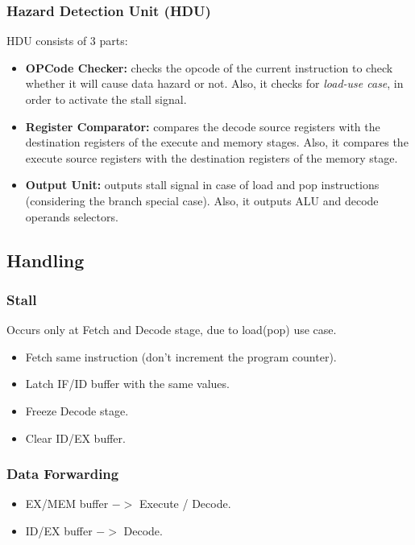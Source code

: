 \subsubsection{Hazard Detection Unit (HDU)}

HDU consists of 3 parts:
\begin{itemize}
    \item \textbf{OPCode Checker:} checks the opcode of the current instruction to check whether it will cause data hazard or not. Also, it checks for \emph{load-use case}, in order to activate the stall signal.
    \item \textbf{Register Comparator:} compares the decode source registers with the destination registers of the execute and memory stages. Also, it compares the execute source registers with the destination registers of the memory stage.
    \item \textbf{Output Unit:} outputs stall signal in case of load and pop instructions (considering the branch special case). Also, it outputs ALU and decode operands selectors. 
\end{itemize}

\subsection{Handling}

\subsubsection{Stall}
Occurs only at Fetch and Decode stage, due to load(pop) use case.
\begin{itemize}
    \item Fetch same instruction (don't increment the program counter).
    \item Latch IF/ID buffer with the same values.
    \item Freeze Decode stage.
    \item Clear ID/EX buffer.
\end{itemize}

\subsubsection{Data Forwarding}
\begin{itemize}
    \item EX/MEM buffer $->$ Execute / Decode.
    \item ID/EX buffer $->$ Decode.
\end{itemize}

